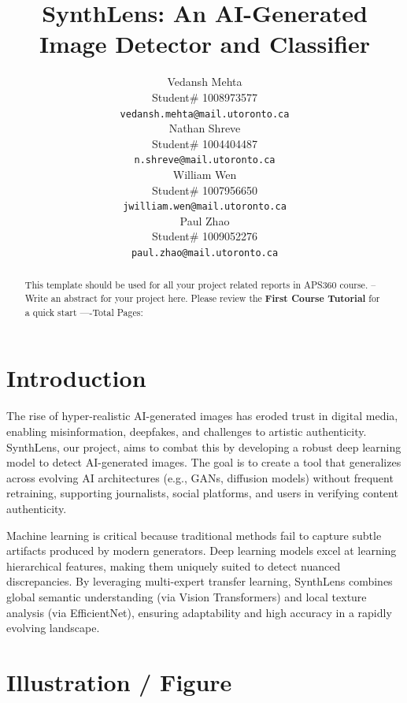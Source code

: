 \documentclass{article} %
\title{SynthLens: An AI-Generated Image Detector and Classifier}
\author{Vedansh Mehta  \\
Student\# 1008973577 \\
\texttt{vedansh.mehta@mail.utoronto.ca} \\
\And
Nathan Shreve  \\
Student\# 1004404487 \\
\texttt{n.shreve@mail.utoronto.ca} \\
\AND
William Wen  \\
Student\# 1007956650 \\
\texttt{jwilliam.wen@mail.utoronto.ca} \\
\And
Paul Zhao \\
Student\# 1009052276 \\
\texttt{paul.zhao@mail.utoronto.ca} \\
\AND
}
\begin{document}
\maketitle

\begin{abstract}
    This template should be used for all your project related reports in APS360 course. -- Write an abstract for your project here. Please review the \textbf{ First Course Tutorial} for a quick start
    ----Total Pages: \pageref{last_page}
\end{abstract}



\section{Introduction}
The rise of hyper-realistic AI-generated images has eroded trust in digital media, enabling misinformation, deepfakes, and challenges to artistic authenticity. SynthLens, our project, aims to combat this by developing a robust deep learning model to detect AI-generated images. The goal is to create a tool that generalizes across evolving AI architectures (e.g., GANs, diffusion models) without frequent retraining, supporting journalists, social platforms, and users in verifying content authenticity.

Machine learning is critical because traditional methods fail to capture subtle artifacts produced by modern generators. Deep learning models excel at learning hierarchical features, making them uniquely suited to detect nuanced discrepancies. By leveraging multi-expert transfer learning, SynthLens combines global semantic understanding (via Vision Transformers) and local texture analysis (via EfficientNet), ensuring adaptability and high accuracy in a rapidly evolving landscape.

\section{Illustration / Figure}
\end{document}
